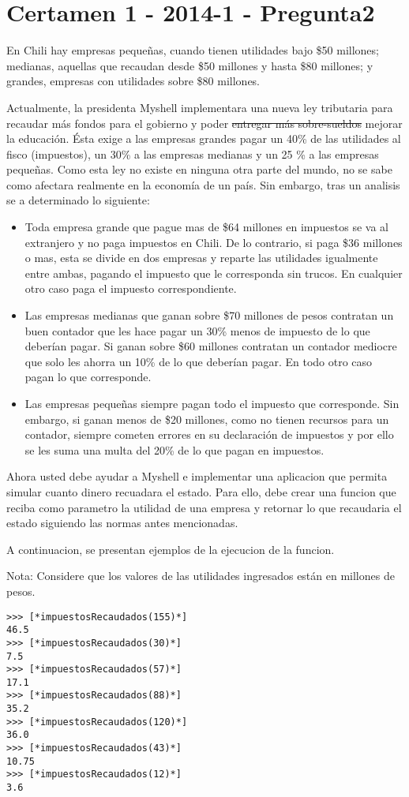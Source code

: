 \section{Certamen 1 - 2014-1 - Pregunta2}

En Chili hay empresas pequeñas, cuando tienen utilidades bajo \$50 millones; medianas, aquellas que recaudan desde \$50 millones y hasta \$80 millones; y grandes, empresas con utilidades
sobre \$80 millones.

Actualmente, la presidenta Myshell implementara una nueva ley tributaria para recaudar más fondos para el gobierno y poder \sout{entregar más sobre-sueldos} mejorar la educación. Ésta exige a las empresas grandes pagar un 40\% de las utilidades al fisco (impuestos), un 30\% a las empresas medianas y un 25 \% a las empresas pequeñas. Como esta ley no existe en ninguna otra parte del mundo, no se sabe como afectara realmente en la economía de un país. Sin embargo, tras un analisis se a determinado lo siguiente: 
\begin{itemize}
    \item Toda empresa grande que pague mas de \$64 millones en impuestos se va al extranjero y no paga impuestos en Chili. De lo contrario, si paga \$36 millones o mas, esta se divide en dos empresas y reparte las utilidades igualmente entre ambas, pagando el impuesto que le corresponda sin trucos. En cualquier otro caso paga el impuesto correspondiente.
    \item Las empresas medianas que ganan sobre \$70 millones de pesos contratan un buen contador que les hace pagar un 30\% menos de impuesto de lo que deberían pagar. Si ganan sobre \$60 millones contratan un contador mediocre que solo les ahorra un 10\% de lo que deberían pagar. En todo otro caso pagan lo que corresponde.
    \item Las empresas pequeñas siempre pagan todo el impuesto que corresponde. Sin embargo, si ganan menos de \$20 millones, como no tienen recursos para un contador, siempre cometen errores en su declaración de impuestos y por ello se les suma una multa del 20\% de lo que pagan en impuestos.
\end{itemize}


Ahora usted debe ayudar a Myshell e implementar una aplicacion que permita simular cuanto dinero recuadara el estado. Para ello, debe crear una funcion que reciba como parametro la utilidad de una empresa y retornar lo que recaudaria el estado siguiendo las normas antes mencionadas.

A continuacion, se presentan ejemplos de la ejecucion de la funcion.

Nota: Considere que los valores de las utilidades ingresados están en millones de pesos.

\begin{lstlisting}[style=consola]
>>> [*impuestosRecaudados(155)*]
46.5
>>> [*impuestosRecaudados(30)*]
7.5
>>> [*impuestosRecaudados(57)*]
17.1
>>> [*impuestosRecaudados(88)*]
35.2
>>> [*impuestosRecaudados(120)*]
36.0
>>> [*impuestosRecaudados(43)*]
10.75
>>> [*impuestosRecaudados(12)*]
3.6

\end{lstlisting}
